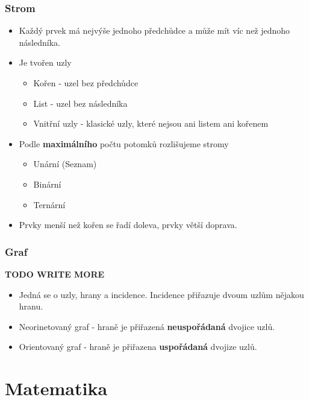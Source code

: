 \documentclass[10pt,a4paper]{article}
\begin{document}
\subsubsection{Strom}
\begin{itemize}
\item Každý prvek má nejvýše jednoho předchůdce a může mít víc než jednoho následníka.
\item Je tvořen uzly
\begin{itemize}
\item Kořen - uzel bez předchůdce
\item List - uzel bez následníka
\item Vnitřní uzly - klasické uzly, které nejsou ani listem ani kořenem
\end{itemize}
\item Podle \textbf{maximálního} počtu potomků rozlišujeme stromy
\begin{itemize}
\item Unární (Seznam)
\item Binární
\item Ternární
\end{itemize}
\item Prvky menší než kořen se řadí doleva, prvky větší doprava.
\end{itemize}

\subsubsection{Graf}
\textbf{TODO WRITE MORE}

\begin{itemize}
\item Jedná se o uzly, hrany a incidence. Incidence přiřazuje dvoum uzlům nějakou hranu.
\item Neorinetovaný graf - hraně je přiřazená \textbf{neuspořádaná} dvojice uzlů.
\item Orientovaný graf - hraně je přiřazena \textbf{uspořádaná} dvojize uzlů.
\end{itemize}
\newpage
\section{Matematika}
\end{document}

